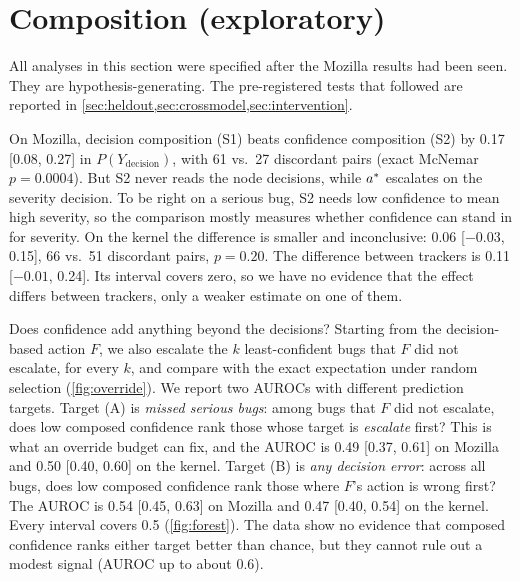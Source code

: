 \section{Composition (exploratory)}
\label{sec:comp}

All analyses in this section were specified after the Mozilla results
had been seen. They are hypothesis-generating. The pre-registered tests
that followed are reported in
\cref{sec:heldout,sec:crossmodel,sec:intervention}.

 On Mozilla, decision
composition (S1) beats confidence composition (S2) by 0.17 [0.08, 0.27]
in $P(Y_{\text{decision}})$, with 61 vs.\ 27 discordant pairs (exact
McNemar $p = 0.0004$). But S2 never reads the node decisions, while
$a^{*}$ escalates on the severity decision. To be right on a
serious bug, S2 needs low confidence to mean high severity, so the
comparison mostly measures whether confidence can stand in for severity.
On the kernel the difference is smaller and inconclusive: 0.06
[$-0.03$, 0.15], 66 vs.\ 51 discordant pairs, $p = 0.20$. The difference
between trackers is 0.11 [$-0.01$, 0.24]. Its interval covers zero, so we
have no evidence that the effect differs between trackers, only a
weaker estimate on one of them.

 Does confidence
add anything beyond the decisions? Starting from the decision-based
action $F$, we also escalate the $k$ least-confident bugs that $F$ did
not escalate, for every $k$, and compare with the exact expectation under
random selection (\cref{fig:override}). We report two AUROCs with
different prediction targets. Target (A)
is \emph{missed serious bugs}: among bugs that $F$ did not escalate, does
low composed confidence rank those whose target is \emph{escalate} first?
This is what an override budget can fix, and the AUROC is 0.49 [0.37,
0.61] on Mozilla and 0.50 [0.40, 0.60] on the kernel. Target (B) is
\emph{any decision error}: across all bugs, does low composed confidence
rank those where $F$'s action is wrong first? The AUROC is 0.54 [0.45,
0.63] on Mozilla and 0.47 [0.40, 0.54] on the kernel. Every interval
covers 0.5 (\cref{fig:forest}). The data show no evidence that composed
confidence ranks either target better than chance, but they cannot rule
out a modest signal (AUROC up to about 0.6). 

